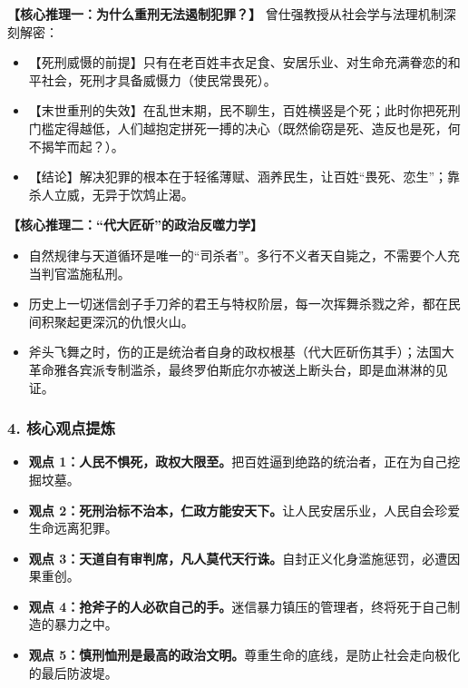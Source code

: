 \noindent\textbf{【核心推理一：为什么重刑无法遏制犯罪？】}
曾仕强教授从社会学与法理机制深刻解密：
\begin{itemize}
    \item 【死刑威慑的前提】只有在老百姓丰衣足食、安居乐业、对生命充满眷恋的和平社会，死刑才具备威慑力（使民常畏死）。
    \item 【末世重刑的失效】在乱世末期，民不聊生，百姓横竖是个死；此时你把死刑门槛定得越低，人们越抱定拼死一搏的决心（既然偷窃是死、造反也是死，何不揭竿而起？）。
    \item 【结论】解决犯罪的根本在于轻徭薄赋、涵养民生，让百姓“畏死、恋生”；靠杀人立威，无异于饮鸩止渴。
\end{itemize}

\noindent\textbf{【核心推理二：“代大匠斫”的政治反噬力学】}
\begin{itemize}
    \item 自然规律与天道循环是唯一的“司杀者”。多行不义者天自毙之，不需要个人充当判官滥施私刑。
    \item 历史上一切迷信刽子手刀斧的君王与特权阶层，每一次挥舞杀戮之斧，都在民间积聚起更深沉的仇恨火山。
    \item 斧头飞舞之时，伤的正是统治者自身的政权根基（代大匠斫伤其手）；法国大革命雅各宾派专制滥杀，最终罗伯斯庇尔亦被送上断头台，即是血淋淋的见证。
\end{itemize}

\subsubsection{4. 核心观点提炼}
\begin{itemize}
    \item \textbf{观点 1：人民不惧死，政权大限至。}把百姓逼到绝路的统治者，正在为自己挖掘坟墓。
    \item \textbf{观点 2：死刑治标不治本，仁政方能安天下。}让人民安居乐业，人民自会珍爱生命远离犯罪。
    \item \textbf{观点 3：天道自有审判席，凡人莫代天行诛。}自封正义化身滥施惩罚，必遭因果重创。
    \item \textbf{观点 4：抢斧子的人必砍自己的手。}迷信暴力镇压的管理者，终将死于自己制造的暴力之中。
    \item \textbf{观点 5：慎刑恤刑是最高的政治文明。}尊重生命的底线，是防止社会走向极化的最后防波堤。
\end{itemize}

